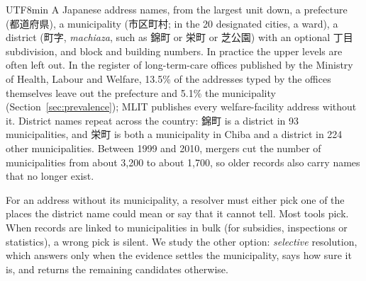 \documentclass[10pt]{article}
\begin{document}
\begin{CJK}{UTF8}{min}
A Japanese address names, from the largest unit down, a prefecture (都道府県), a municipality (市区町村;
in the 20 designated cities, a ward), a district (町字, \emph{machiaza}, such as 錦町 or 栄町 or 芝公園)
with an optional 丁目 subdivision, and block and building numbers. In practice the upper levels are often
left out. In the register of long-term-care offices published by the Ministry of Health, Labour and
Welfare, 13.5\% of the addresses typed by the offices themselves leave out the prefecture and 5.1\% the
municipality (Section~\ref{sec:prevalence}); MLIT publishes every welfare-facility address without it.
District names repeat across the country: 錦町 is a district in 93 municipalities, and 栄町 is both a
municipality in Chiba and a district in 224 other municipalities. Between 1999 and 2010, mergers cut the
number of municipalities from about 3,200 to about 1,700, so older records also carry names that no
longer exist.

For an address without its municipality, a resolver must either pick one of the places the district
name could mean or say that it cannot tell. Most tools pick. When records are linked to municipalities
in bulk (for subsidies, inspections or statistics), a wrong pick is silent. We study the other
option: \emph{selective} resolution, which answers only when the evidence settles the municipality, says
how sure it is, and returns the remaining candidates otherwise.


\end{CJK}
\end{document}
